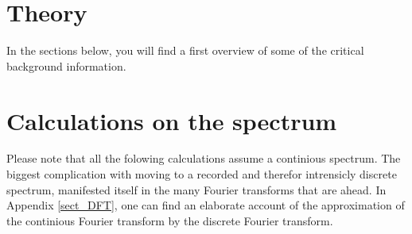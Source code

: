 \documentclass[12pt,a4paper]{article}
\numberwithin{equation}{section}
\numberwithin{figure}{section}
\numberwithin{table}{section}
\begin{document}
\newpage
\section{Theory}
In the sections below, you will find a first overview of some of the critical background information.






\newpage 
\section{Calculations on the spectrum} %
Please note that all the folowing calculations assume a continious spectrum. The biggest complication with moving to a recorded and therefor intrensicly discrete spectrum, manifested itself in the many Fourier transforms that are ahead. In Appendix \ref{sect_DFT}, one can find an elaborate account of the approximation of the continious Fourier transform by the discrete Fourier transform.
\label{sec:calculations_on_the_spectrum}




\vspace{2cm}
%
%
\newpage
\printbibliography
%
%
%
\newpage
\appendix
\appendixpage
\addappheadtotoc


\end{document}

